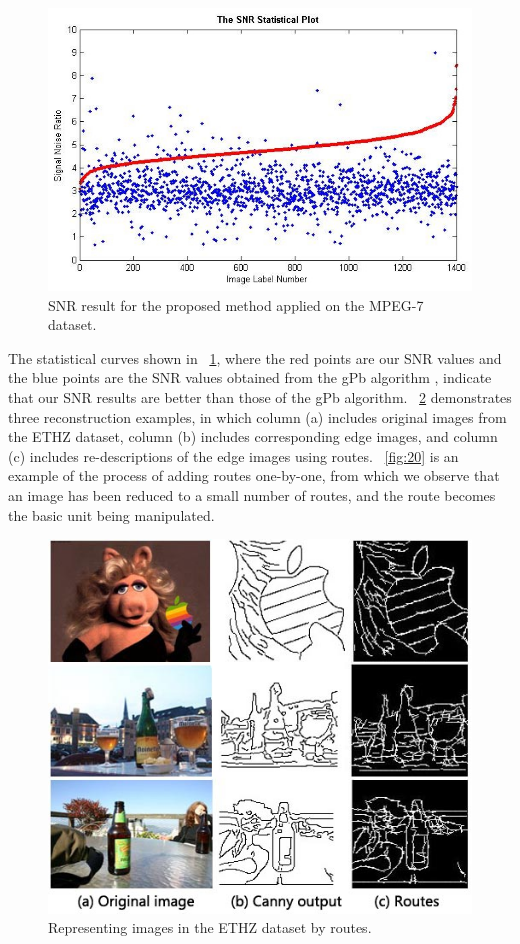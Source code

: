 \documentclass[journal]{IEEEtran}
\begin{document}
\begin{figure}[!t]
\centering
\includegraphics[width=0.95\linewidth]{images/fig18.jpg}
\caption{SNR result for the proposed method applied on the MPEG-7 dataset.}
\label{fig:18}
\end{figure}

The statistical curves shown in \figurename~\ref{fig:18}, 
where the red points are our SNR values and the blue points are the SNR values obtained from the gPb algorithm 
\cite{maire2008}, indicate that our SNR results are better than those of the gPb algorithm.
\figurename~\ref{fig:19} demonstrates three reconstruction examples,
in which column (a) includes original images from the ETHZ dataset, 
column (b) includes corresponding edge images, 
and column (c) includes re-descriptions of the edge images using routes.
\figurename~\ref{fig:20} is an example of the process of adding routes one-by-one, 
from which we observe that an image has been reduced to a small number of routes, and the route becomes the basic unit being manipulated.

\begin{figure}[!t]
\centering
\includegraphics[width=0.9\linewidth]{images/fig19.jpg}
\caption{Representing images in the ETHZ dataset by routes.}
\label{fig:19}
\end{figure}
\end{document}
